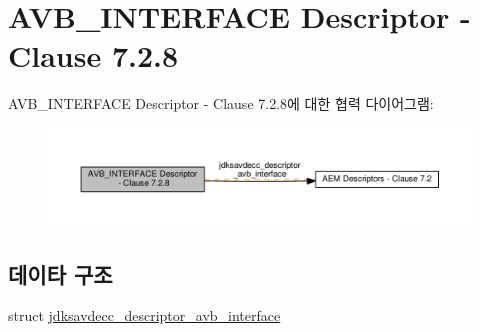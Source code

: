 \hypertarget{group__descriptor__avb__interface}{}\section{A\+V\+B\+\_\+\+I\+N\+T\+E\+R\+F\+A\+CE Descriptor -\/ Clause 7.2.8}
\label{group__descriptor__avb__interface}
A\+V\+B\+\_\+\+I\+N\+T\+E\+R\+F\+A\+CE Descriptor -\/ Clause 7.2.8에 대한 협력 다이어그램\+:
\nopagebreak
\begin{figure}[H]
\begin{center}
\leavevmode
\includegraphics[width=350pt]{group__descriptor__avb__interface}
\end{center}
\end{figure}
\subsection*{데이타 구조}
\begin{DoxyCompactItemize}
\item 
struct \hyperlink{structjdksavdecc__descriptor__avb__interface}{jdksavdecc\+\_\+descriptor\+\_\+avb\+\_\+interface}
\end{DoxyCompactItemize}
